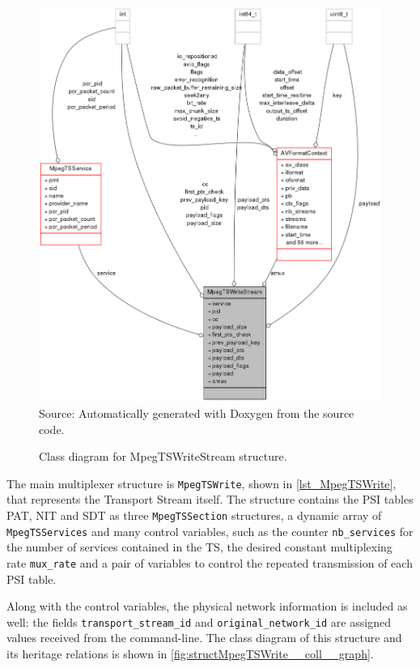\documentclass[
	12pt,				%
	openright,			%
	twoside,			%
	a4paper,			%
	brazil,
	french,				%
	english
	]{abntex2}
\begin{document}
\begin{figure}[!b]
\centering
\caption{Class diagram for MpegTSWriteStream structure.}
\includegraphics[width=0.9\linewidth]{figuras/structMpegTSWriteStream__coll__graph.png}
\\Source: Automatically generated with Doxygen from the source code.
\label{fig:structMpegTSWriteStream__coll__graph}
\end{figure}

The main multiplexer structure is \texttt{MpegTSWrite}, shown in \autoref{lst_MpegTSWrite}, that represents the Transport Stream itself. The structure contains the PSI tables PAT, NIT and SDT as three \texttt{MpegTSSection} structures, a dynamic array of \texttt{MpegTSServices} and many control variables, such as the counter \texttt{nb\hspace{0.1mm}\_\hspace{0.1mm}services} for the number of services contained in the TS, the desired constant multiplexing rate \texttt{mux\hspace{0.1mm}\_\hspace{0.1mm}rate} and a pair of variables to control the repeated transmission of each PSI table.

Along with the control variables, the physical network information is included as well: the fields \texttt{transport\hspace{0.1mm}\_\hspace{0.1mm}stream\hspace{0.1mm}\_\hspace{0.1mm}id} and \texttt{original\hspace{0.1mm}\_\hspace{0.1mm}network\hspace{0.1mm}\_\hspace{0.1mm}id} are assigned values received from the command-line. The class diagram of this structure and its heritage relations is shown in \autoref{fig:structMpegTSWrite__coll__graph}.
\end{document}
